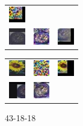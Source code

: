 \begin{figure}[h]
\begin{subtable}{.11\linewidth}
{\begin{tabular}{ l l l }
   \includegraphics[width = 20pt]{enhimages431818/rec_77.jpg} \\
  \includegraphics[width = 20pt]{enhimages431818/ori_91.jpg} &  \includegraphics[width = 20pt]{defimages431818/rec_91.jpg} &
   \includegraphics[width = 20pt]{enhimages431818/rec_91.jpg} \\
\end{tabular}}
\caption{43-18-18}%
\end{subtable}%
\hfill
\begin{subtable}{.11\linewidth}\centering
{\begin{tabular}{ l l l }
  \includegraphics[width = 20pt]{enhimagesHybrid/ori_77.jpg} &  \includegraphics[width = 20pt]{defimagesHybrid/rec_77.jpg} &
   \includegraphics[width = 20pt]{enhimagesHybrid/rec_77.jpg} \\
  \includegraphics[width = 20pt]{enhimagesHybrid/ori_91.jpg} &  \includegraphics[width = 20pt]{defimagesHybrid/rec_91.jpg} &

\end{tabular}}
\end{subtable}
\end{figure}
